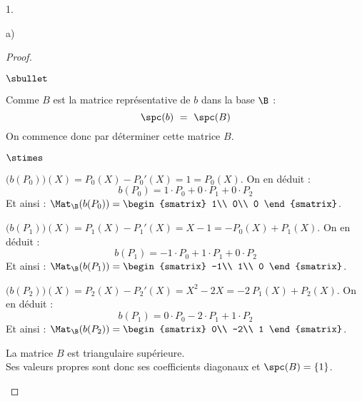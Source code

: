 \begin{noliste}{1.}
\begin{noliste}{a)}
    \begin{proof}~
      \begin{noliste}{$\sbullet$}
      \item Comme $B$ est la matrice représentative de $b$ dans la
        base $\B$ :
        \[
        \spc(b) \ = \ \spc(B)
        \]
        On commence donc par déterminer cette matrice $B$.
        \begin{noliste}{$\stimes$}
	\item $\big( b(P_0) \big) (X) = P_0(X) - P_0'(X) = 1 =
          P_0(X)$. On en déduit :
          \[
          b(P_0) = 1 \cdot P_0 + 0 \cdot P_1 + 0 \cdot P_2
          \]
          Et ainsi : $\Mat_{\B}(b(P_0)) =
          \begin{smatrix}
            1\\
            0\\
            0
          \end{smatrix}$.
	
	\item $\big( b(P_1) \big) (X) = P_1(X) - P_1'(X) = X - 1 =
          -P_0(X) + P_1(X)$. On en déduit :
          \[
          b(P_1) = -1 \cdot P_0 + 1 \cdot P_1 + 0 \cdot P_2
          \]
          Et ainsi : $\Mat_{\B}(b(P_1)) =
          \begin{smatrix}
            -1\\
            1\\
            0
          \end{smatrix}$.

	\item $\big( b(P_2) \big) (X) = P_2(X) - P_2'(X) = X^2 - 2X =
          -2 \ P_1(X) + P_2(X)$. On en déduit :
          \[
          b(P_1) = 0 \cdot P_0 - 2 \cdot P_1 + 1 \cdot P_2
          \]
          Et ainsi : $\Mat_{\B}(b(P_2)) =
          \begin{smatrix}
            0\\
            -2\\
            1
          \end{smatrix}$.
	\end{noliste}

      \item La matrice $B$ est triangulaire supérieure.\\
        Ses valeurs propres sont donc ses coefficients diagonaux et
        $\spc(B) = \{ 1 \}$.%
	~\\[-1cm]
      \end{noliste}
    \end{proof}
    

\end{noliste}
\end{noliste}
